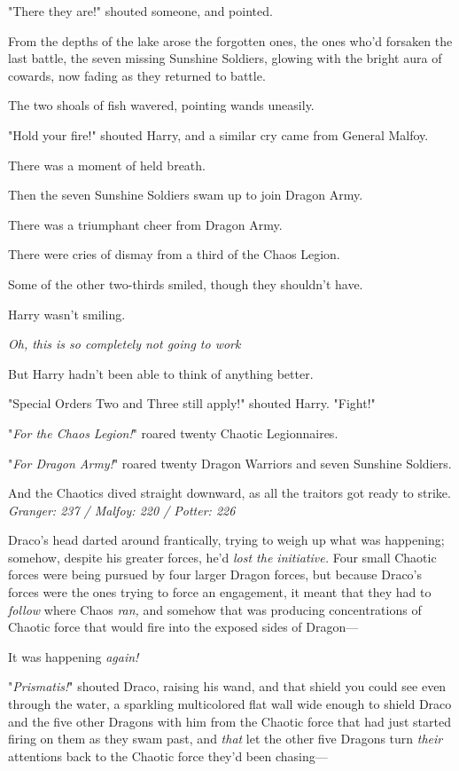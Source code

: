 "There they are!" shouted someone, and pointed.

From the depths of the lake arose the forgotten ones, the ones who'd forsaken
the last battle, the seven missing Sunshine Soldiers, glowing with the bright
aura of cowards, now fading as they returned to battle.

The two shoals of fish wavered, pointing wands uneasily.

"Hold your fire!" shouted Harry, and a similar cry came from General Malfoy.

There was a moment of held breath.

Then the seven Sunshine Soldiers swam up to join Dragon Army.

There was a triumphant cheer from Dragon Army.

There were cries of dismay from a third of the Chaos Legion.

Some of the other two-thirds smiled, though they shouldn't have.

Harry wasn't smiling.

\emph{Oh, this is so completely not going to work{\el}}

But Harry hadn't been able to think of anything better.

"Special Orders Two and Three still apply!" shouted Harry. "Fight!"

"\emph{For the Chaos Legion!}" roared twenty Chaotic Legionnaires.

"\emph{For Dragon Army!}" roared twenty Dragon Warriors and seven Sunshine
Soldiers.

And the Chaotics dived straight downward, as all the traitors got ready to
strike.
\sbreak
\emph{Granger: 237 / Malfoy: 220 / Potter: 226}

Draco's head darted around frantically, trying to weigh up what was happening;
somehow, despite his greater forces, he'd \emph{lost the initiative.} Four
small Chaotic forces were being pursued by four larger Dragon forces, but
because Draco's forces were the ones trying to force an engagement, it meant
that they had to \emph{follow} where Chaos \emph{ran,} and somehow that was
producing concentrations of Chaotic force that would fire into the exposed
sides of Dragon---

It was happening \emph{again!}

"\emph{Prismatis!}" shouted Draco, raising his wand, and that shield you could
see even through the water, a sparkling multicolored flat wall wide enough to
shield Draco and the five other Dragons with him from the Chaotic force that
had just started firing on them as they swam past, and \emph{that} let the
other five Dragons turn \emph{their} attentions back to the Chaotic force
they'd been chasing---

